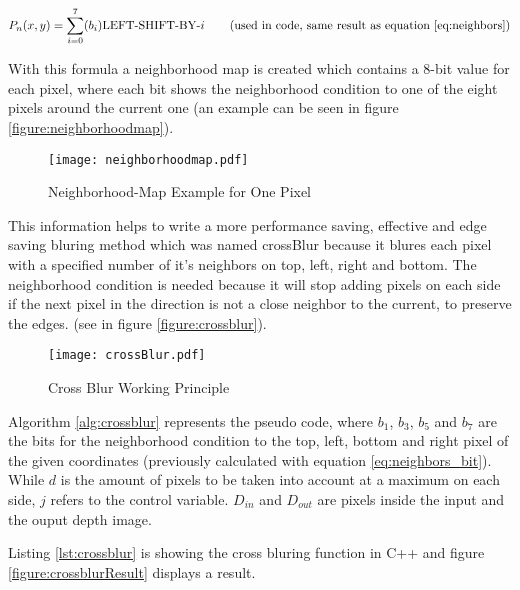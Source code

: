 \begin{equation}
	P_n(x,y)=\sum_{i=0}^7 (b_i)\mbox{LEFT-SHIFT-BY-$i$ \hspace{0.5cm} (used in code, same result as equation \ref{eq:neighbors})}
\label{eq:neighbors_cpp} 
\end{equation}
 
 
With this formula a neighborhood map is created which contains a 8-bit value for each pixel, where each bit shows the neighborhood 
condition to one of the eight pixels around the current one (an example can be seen in figure \vref{figure:neighborhoodmap}).

\begin{figure}[H]
\begin{center}
  \texttt{[image: neighborhoodmap.pdf]}
  \caption{Neighborhood-Map Example for One Pixel}
  \label{figure:neighborhoodmap}
\end{center}
\end{figure}

This information helps to write a more performance saving, effective and edge saving bluring method which 
was named crossBlur because it blures each pixel with a specified number of it's neighbors on top, left, right and bottom.
The neighborhood condition is needed because it will stop adding pixels on each side if the next pixel in the direction 
is not a close neighbor to the current, to preserve the edges. (see in figure \vref{figure:crossblur}).

\begin{figure}[H]
\begin{center}
  \texttt{[image: crossBlur.pdf]}
  \caption{Cross Blur Working Principle}
  \label{figure:crossblur}
\end{center}
\end{figure} 



Algorithm \vref{alg:crossblur} represents the pseudo code, where $b_1$, $b_3$, $b_5$
and $b_7$ are the bits for the neighborhood condition to the top, left, bottom and right pixel
of the given coordinates (previously calculated with equation \vref{eq:neighbors_bit}). While
$d$ is the amount of pixels to be taken into account at a maximum on each side, $j$ refers to the control
variable.  $D_{in}$ and $D_{out}$ are pixels inside the input and the ouput depth image.

Listing \vref{lst:crossblur} is showing the cross bluring function in C++ and figure \vref{figure:crossblurResult} 
displays a result.


